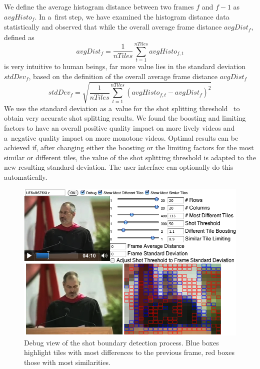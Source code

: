We define the average histogram distance between two frames
$\mathit{f}$ and $\mathit{f - 1}$ as $\mathit{avgHisto_{f}}$.
In a~first step, we have examined the histogram distance
data statistically and observed that while
the overall average frame distance $\mathit{avgDist_{f}}$,
defined as $$\mathit{avgDist_{f}} =
\frac{1}{\mathit{nTiles}}\sum_{t=1}^{\mathit{nTiles}}
\mathit{avgHisto_{f, t}}$$ is very intuitive to human beings,
far more value lies in the standard deviation
$\mathit{stdDev_{f}}$, based on the definition of the overall
average frame distance $\mathit{avgDist_{f}}$
$$\mathit{stdDev_{f}} =
\sqrt{\frac{1}{\mathit{nTiles}}\sum_{t=1}^{\mathit{nTiles}}
(\mathit{avgHisto_{f, t}} - \mathit{avgDist_{f}})^{2}}$$
We use the standard deviation as a~value for the shot splitting
threshold~\cite{lienhart1999comparison}
to obtain very accurate shot splitting results.
We found the boosting and limiting factors to have an overall
positive quality impact on more lively videos
and a~negative quality impact on more monotone videos.
Optimal results can be achieved if,
after changing either the boosting or the limiting factors
for the most similar or different tiles,
the value of the shot splitting threshold is adapted
to the new resulting standard deviation.
The user interface can optionally do this automatically.

\begin{figure}
\centering
    \includegraphics[width=1.0\linewidth]{./algorithm.png}
  \caption[Debug view of the shot boundary detection process]
    {Debug view of the shot boundary detection process.
    Blue boxes highlight tiles with most differences
    to the previous frame, red boxes those with most similarities.}
  \label{fig:algorithm}
\end{figure}

